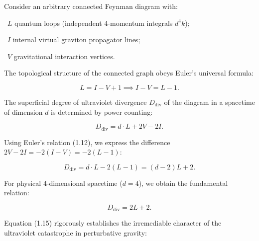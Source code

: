 \documentclass[11pt,a4paper]{article}
\theoremstyle{definition}
\begin{document}
Consider an arbitrary connected Feynman diagram with:

\textbullet~$L$ quantum loops (independent 4-momentum integrals $d^4k$);

\textbullet~$I$ internal virtual graviton propagator lines;

\textbullet~$V$ gravitational interaction vertices.

The topological structure of the connected graph obeys Euler's universal formula:

\begin{equation}\label{eq:1.12}\tag{1.12}
L = I - V + 1 \implies I - V = L - 1.
\end{equation}

The superficial degree of ultraviolet divergence $D_{\text{div}}$ of the diagram in a spacetime of dimension $d$ is determined by power counting:

\begin{equation}\label{eq:1.13}\tag{1.13}
D_{\text{div}} = d \cdot L + 2V - 2I.
\end{equation}

Using Euler's relation (1.12), we express the difference $2V - 2I = -2(I - V) = -2(L - 1)$:

\begin{equation}\label{eq:1.14}\tag{1.14}
D_{\text{div}} = d \cdot L - 2(L - 1) = (d - 2) L + 2.
\end{equation}

For physical 4-dimensional spacetime ($d = 4$), we obtain the fundamental relation:

\begin{equation}\label{eq:1.15}\tag{1.15}
D_{\text{div}} = 2L + 2.
\end{equation}

Equation (1.15) rigorously establishes the irremediable character of the ultraviolet catastrophe in perturbative gravity:
\end{document}
